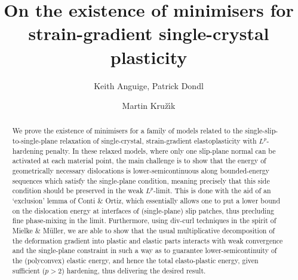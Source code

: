\documentclass[11pt,reqno]{amsart}
\theoremstyle{plain}
\theoremstyle{definition}
\theoremstyle{remark}
\begin{document}
\author[Keith~Anguige]{Keith Anguige, Patrick Dondl}
\address{Abteilung für Angewandte Mathematik,
	Albert-Ludwigs-Universität Freiburg,
	Hermann-Herder-Str. 10,
	79104 Freiburg i. Br., Germany}
 

\author{Martin Kru\v{z}\'{\i}k}
\address{Institute of Information Theory and Automation,
Czech Academy of Sciences, Pod vod\'{a}renskou
v\v{e}\v{z}\'{\i}~4, CZ-182~08~Praha~8, Czech Republic (corresponding
address) \& Faculty of Civil Engineering, Czech Technical
University, Th\'{a}kurova 7, CZ-166~ 29~Praha~6, Czech Republic}



\title{On the existence of minimisers for strain-gradient single-crystal plasticity}


\begin{abstract}We prove the existence of minimisers for a family of models related to the single-slip-to-single-plane relaxation of single-crystal, strain-gradient elastoplasticity with $L^p$-hardening penalty. In these relaxed models, where only one slip-plane normal can be activated at each material point, the main challenge is to show that the energy of geometrically necessary dislocations is lower-semicontinuous along bounded-energy sequences which satisfy the single-plane condition, meaning precisely that this side condition should be preserved in the weak $L^p$-limit. This is done with the aid of an `exclusion' lemma of Conti \& Ortiz, %
 which essentially allows one to put a lower bound on the dislocation energy at interfaces of (single-plane) slip patches, thus precluding fine phase-mixing in the limit. Furthermore, using div-curl techniques in the spirit of Mielke \& M\"uller, we are able to show that the usual multiplicative decomposition of the deformation gradient into plastic and elastic parts interacts with weak convergence and the single-plane constraint in such a way as to guarantee lower-semicontinuity of the (polyconvex) elastic energy, and hence the total elasto-plastic energy, given sufficient ($p>2$) hardening, thus delivering the desired result.
\end{abstract}
 
\maketitle 
\end{document}

